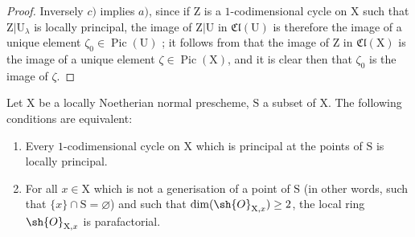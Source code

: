 \begin{proof}
Inversely $c)$ implies $a)$, since if $\mathrm{Z}$ is a $1$-codimensional cycle on $\mathrm{X}$ such that $\mathrm{Z}|\mathrm{U}_\lambda$ is locally principal, the image of $\mathrm{Z}|\mathrm{U}$ in $\mathfrak{Cl}(\mathrm{U})$ is therefore the image of a unique element $\zeta_0\in\operatorname{Pic}(\mathrm{U})$ ; it follows from  that the image of $\mathrm{Z}$ in $\mathfrak{Cl}(\mathrm{X})$ is the image of a unique element $\zeta\in\operatorname{Pic}(\mathrm{X})$, and it is clear then that $\zeta_0$ is the image of $\zeta$.
\end{proof}

\begin{corollary}[21.13.15]
\label{IV.21.13.15}
Let $\mathrm{X}$ be a locally Noetherian normal prescheme, $\mathrm{S}$ a subset of $\mathrm{X}$.
The following conditions are equivalent:
\begin{enumerate}[label=\emph{\alph*)}]
  \item Every $1$-codimensional cycle on $\mathrm{X}$ which is principal at the points of $\mathrm{S}$ is locally principal.
  \item For all $x\in\mathrm{X}$ which is not a generisation of a point of $\mathrm{S}$ (in other words, such that $\{x\}\cap\mathrm{S}=\varnothing$) and such that $\dim(\sh{O}_{\mathrm{X},x})\geq 2$, the local ring $\sh{O}_{\mathrm{X},x}$ is parafactorial.
\end{enumerate}
\end{corollary}

